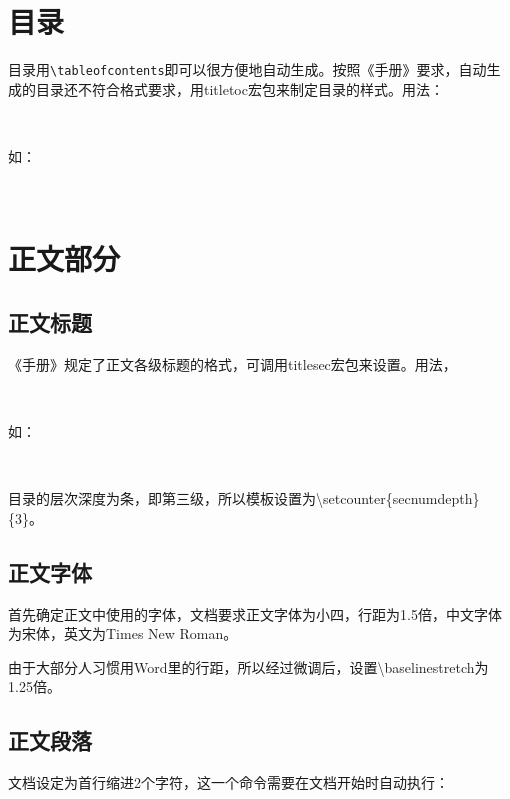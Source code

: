 \section{目录}
目录用\verb|\tableofcontents|即可以很方便地自动生成。按照《手册》要求，自动生成的目录还不符合格式要求，用titletoc宏包来制定目录的样式。用法：

{\\}

如：

{\\}

\section{正文部分}
\subsection{正文标题}
《手册》规定了正文各级标题的格式，可调用titlesec宏包来设置。用法，

{\\}

如：

{\centering {\verb|\titleformat{\chapter}{\filcenter \heiti \bfseries \sanhao}{\thechapter}{1em}{}|}\\}

目录的层次深度为条，即第三级，所以模板设置为\textbackslash setcounter\{secnumdepth\}\{3\}。
\subsection{正文字体}
\label{sec:normalsize}
首先确定正文中使用的字体，文档要求正文字体为小四，行距为1.5倍，中文字体为宋体，英文为Times New Roman。

由于大部分人习惯用Word里的行距，所以经过微调后，设置\textbackslash baselinestretch为1.25倍。

\subsection{正文段落}
文档设定为首行缩进2个字符，这一个命令需要在文档开始时自动执行：

